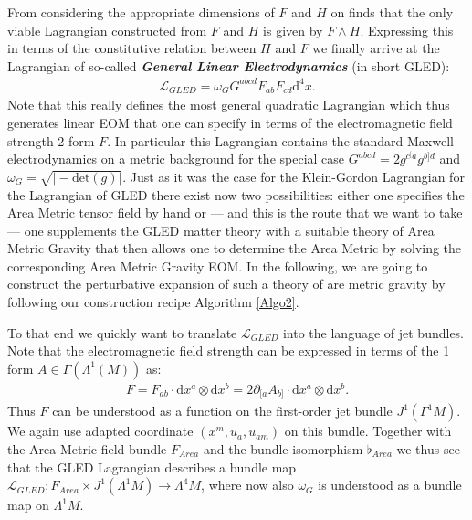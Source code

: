 \documentclass[a4paper,12pt, DIV=14, BCOR=5mm, twoside, headsepline, numbers=noenddot]{scrbook}
\begin{document}
From considering the appropriate dimensions of $F$ and $H$ on finds that the only viable Lagrangian constructed from $F$ and $H$ is given by $F \wedge H$. Expressing this in terms of the constitutive relation between $H$ and $F$ we finally arrive at the Lagrangian of so-called \textbf{\textit{General Linear Electrodynamics}} (in short GLED):
\begin{align}
    \mathcal{L}_{GLED} = \omega_G G^{abcd}F_{ab}F_{cd}\mathrm{d}^4x.
\end{align}
Note that this really defines the most general quadratic Lagrangian which thus generates linear EOM that one can specify in terms of the electromagnetic field strength 2 form $F$. In particular this Lagrangian contains the standard Maxwell electrodynamics on a metric background for the special case $G^{abcd} = 2 g^{c^[a}g^{b]d}$ and $\omega_{G}=\sqrt{\vert -\mathrm{det}(g) \vert}$. Just as it was the case for the Klein-Gordon Lagrangian for the Lagrangian of GLED there exist now two possibilities: either one specifies the Area Metric tensor field by hand or --- and this is the route that we want to take --- one supplements the GLED matter theory with a suitable theory of Area Metric Gravity that then allows one to determine the Area Metric by solving the corresponding Area Metric Gravity EOM. 
In the following, we are going to construct the perturbative expansion of such a theory of are metric gravity by following our construction recipe Algorithm \ref{Algo2}.

To that end we quickly want to translate $\mathcal{L}_{GLED}$ into the language of jet bundles. Note that the electromagnetic field strength can be expressed in terms of the 1 form $A \in \Gamma(\Lambda^1(M))$ as:
\begin{align}
F = F_{ab} \cdot  \mathrm{d}x^a \otimes \mathrm{d}x^b = 2 \partial_{[a} A_{b]} \cdot \mathrm{d}x^a \otimes \mathrm{d}x^b.
\end{align}
Thus $F$ can be understood as a function on the first-order jet bundle $J^1(\Gamma^1M)$. We again use adapted coordinate $(x^m,u_a,u_{am})$ on this bundle. Together with the Area Metric field bundle $F_{Area}$ and the bundle isomorphism $\flat_{Area}$ we thus see that the GLED Lagrangian describes a bundle map $\mathcal{L}_{GLED} : F_{Area} \times J^1(\Lambda^1M) \rightarrow \Lambda^4M $, where now also $\omega_G$ is understood as a bundle map on $\Lambda^1M$.  
\end{document}
